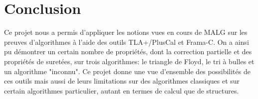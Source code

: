 \documentclass[a4paper,11pt, oneside]{book}
\begin{document}
	\chapter{Conclusion}

		Ce projet nous a permis d'appliquer les notions vues en cours de MALG sur les
		preuves d'algorithmes à l'aide des outils TLA+/PlusCal et Frama-C. On a ainsi
		pu démontrer un certain nombre de propriétés, dont la correction partielle et
		des propriétés de suretées, sur trois algorithmes: le triangle de Floyd,
		le tri à bulles et un algorithme "inconnu". Ce projet donne une vue d'ensemble
		des possibilités de ces outils mais aussi de leurs limitations sur des
		algorithmes classiques et sur certain algorithmes particulier, autant en
		termes de calcul que de structures.
\end{document}
